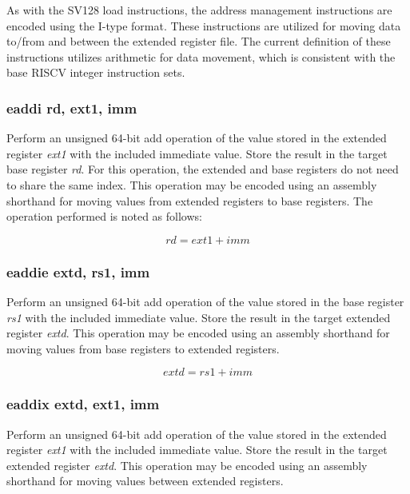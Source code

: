 \documentclass{article}
\begin{document}
As with the SV128 load instructions, the address management instructions 
are encoded using the I-type format.  These instructions are utilized for 
moving data to/from and between the extended register file.  The current 
definition of these instructions utilizes arithmetic for data movement, 
which is consistent with the base RISCV integer instruction sets.

\subsubsection{eaddi rd, ext1, imm}

Perform an unsigned 64-bit add operation of the value stored in the extended 
register \textit{ext1} with the included immediate value.  Store the result 
in the target base register \textit{rd}.  For this operation, the extended and base registers 
do not need to share the same index.  This operation may be encoded 
using an assembly shorthand for moving values from extended registers 
to base registers.  The operation performed is noted as follows:

\begin{equation}
rd = ext1 + imm
\end{equation}

\subsubsection{eaddie extd, rs1, imm}

Perform an unsigned 64-bit add operation of the value stored in the base 
register \textit{rs1} with the included immediate value.  Store the result in the 
target extended register \textit{extd}.  This operation may be encoded 
using an assembly shorthand for moving values from base registers 
to extended registers.

\begin{equation}
extd = rs1 + imm
\end{equation}

\subsubsection{eaddix extd, ext1, imm}

Perform an unsigned 64-bit add operation of the value stored in the extended
register \textit{ext1} with the included immediate value.  Store the result in the 
target extended register \textit{extd}.  This operation may be encoded using 
an assembly shorthand for moving values between extended registers.  
\end{document}
